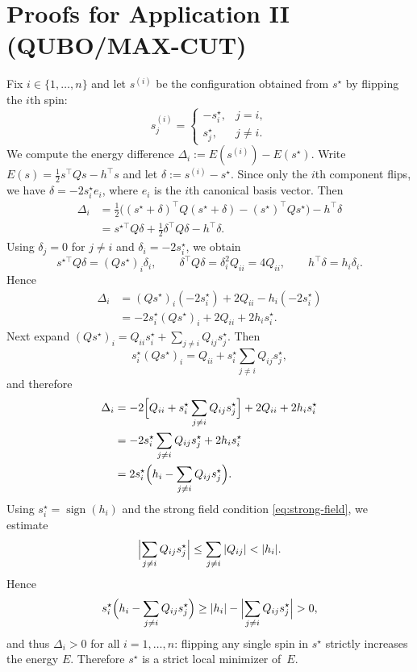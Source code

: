 \documentclass[journal]{IEEEtran}
\begin{document}
\section{Proofs for Application II (QUBO/MAX-CUT)}\label{app:qubo-proofs}

\begin{IEEEproof}
Fix $i \in \{1,\dots,n\}$ and let $s^{(i)}$ be the configuration obtained
from $s^\star$ by flipping the $i$th spin:
\[
  s^{(i)}_j =
  \begin{cases}
    -s_i^\star, & j = i,\\
    s_j^\star,  & j \neq i.
  \end{cases}
\]
We compute the energy difference
$\Delta_i := E(s^{(i)}) - E(s^\star)$.
Write $E(s) = \frac{1}{2} s^\top Q s - h^\top s$ and
let $\delta := s^{(i)} - s^\star$.
Since only the $i$th component flips, we have
$\delta = -2 s_i^\star e_i$, where $e_i$ is the $i$th canonical basis vector.
Then
\begin{align*}
  \Delta_i
  &= \frac{1}{2}\bigl((s^\star+\delta)^\top Q (s^\star+\delta)
      - (s^\star)^\top Q s^\star\bigr) - h^\top \delta \\
  &= s^{\star\top} Q \delta + \frac{1}{2} \delta^\top Q \delta - h^\top \delta.
\end{align*}
Using $\delta_j = 0$ for $j \neq i$ and $\delta_i = -2 s_i^\star$, we obtain
\[
  s^{\star\top} Q \delta = (Q s^\star)_i \delta_i,
  \qquad
  \delta^\top Q \delta = \delta_i^2 Q_{ii} = 4 Q_{ii},
  \qquad
  h^\top \delta = h_i \delta_i.
\]
Hence
\begin{align*}
  \Delta_i
  &= (Q s^\star)_i (-2 s_i^\star) + 2 Q_{ii} - h_i (-2 s_i^\star) \\
  &= -2 s_i^\star (Q s^\star)_i + 2 Q_{ii} + 2 h_i s_i^\star.
\end{align*}
Next expand $(Q s^\star)_i = Q_{ii} s_i^\star + \sum_{j \neq i} Q_{ij} s_j^\star$.
Then
\[
  s_i^\star (Q s^\star)_i
  = Q_{ii} + s_i^\star \sum_{j \neq i} Q_{ij} s_j^\star,
\]
and therefore
\begin{align*}
  \Delta_i
  &= -2\Bigl[Q_{ii} + s_i^\star \sum_{j \neq i} Q_{ij} s_j^\star\Bigr]
     + 2 Q_{ii} + 2 h_i s_i^\star \\
  &= -2 s_i^\star \sum_{j \neq i} Q_{ij} s_j^\star + 2 h_i s_i^\star \\
  &= 2 s_i^\star \Bigl(h_i - \sum_{j \neq i} Q_{ij} s_j^\star\Bigr).
\end{align*}
Using $s_i^\star = \operatorname{sign}(h_i)$ and the strong field condition
\eqref{eq:strong-field}, we estimate
\[
  \Bigl| \sum_{j \neq i} Q_{ij} s_j^\star \Bigr|
  \leq \sum_{j \neq i} |Q_{ij}|
  < |h_i|.
\]
Hence
\[
  s_i^\star\Bigl(h_i - \sum_{j \neq i} Q_{ij} s_j^\star\Bigr)
  \geq |h_i| - \Bigl|\sum_{j \neq i} Q_{ij} s_j^\star\Bigr|
  > 0,
\]
and thus $\Delta_i > 0$ for all $i=1,\dots,n$:
flipping any single spin in $s^\star$ strictly increases the energy $E$.
Therefore $s^\star$ is a strict local minimizer of~$E$.


\end{IEEEproof}
\end{document}
